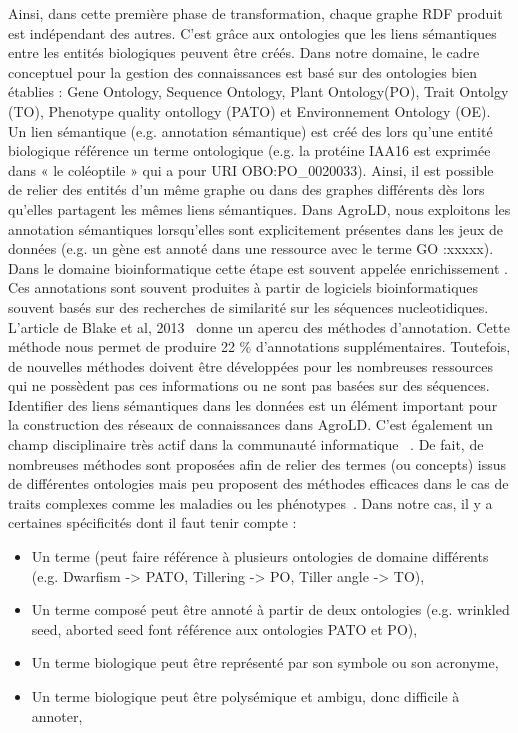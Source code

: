 Ainsi, dans cette première phase de transformation, chaque graphe RDF produit est indépendant des autres. C’est grâce aux ontologies que les liens sémantiques entre les entités biologiques peuvent être créés. Dans notre domaine, le cadre conceptuel pour la gestion des connaissances est basé sur des ontologies bien établies : Gene Ontology, Sequence Ontology, Plant Ontology(PO), Trait Ontolgy (TO), Phenotype quality ontollogy (PATO) et Environnement Ontology (OE). Un lien sémantique (e.g. annotation sémantique) est créé des lors qu’une entité biologique référence un terme ontologique (e.g. la protéine IAA16 est exprimée dans « le coléoptile » qui a pour URI OBO:PO\_0020033). Ainsi, il est possible de relier des entités d’un même graphe ou dans des graphes différents dès lors qu’elles partagent les mêmes liens sémantiques. Dans AgroLD, nous exploitons les annotation sémantiques lorsqu’elles sont explicitement présentes dans les jeux de données (e.g. un gène est annoté dans une ressource avec le terme GO :xxxxx). Dans le domaine bioinformatique cette étape est souvent appelée enrichissement \cite{Boyle2004,Sheehan2008,topgo2016}. Ces annotations sont souvent produites à partir de logiciels bioinformatiques souvent basés sur des recherches de similarité sur les séquences nucleotidiques. L'article de Blake et al, 2013~\cite{blake2013} donne un apercu des méthodes d'annotation. Cette méthode nous permet de produire 22 \% d’annotations supplémentaires. Toutefois, de nouvelles méthodes doivent être développées pour les nombreuses ressources qui ne possèdent pas ces informations ou ne sont pas basées sur des séquences.\\

Identifier des liens sémantiques dans les données est un élément important pour la construction des réseaux de connaissances dans AgroLD. C’est également un champ disciplinaire très actif dans la communauté informatique~\cite{Faria2013,Otero-Cerdeira2015} . De fait, de nombreuses méthodes sont proposées afin de relier des termes (ou concepts) issus de différentes ontologies mais peu proposent des méthodes efficaces dans le cas de traits complexes comme les maladies ou les phénotypes~\cite{harrow2017}. Dans notre cas, il y a certaines spécificités dont il faut tenir compte : \\


\begin{itemize}
\item Un terme (peut faire référence à plusieurs ontologies de domaine différents (e.g. Dwarfism -> PATO, Tillering -> PO, Tiller angle -> TO),
\item Un terme composé peut être annoté à partir de deux ontologies (e.g. wrinkled seed, aborted seed font référence aux ontologies PATO et PO),
\item Un terme biologique peut être représenté par son symbole ou son acronyme,
\item Un terme biologique peut être polysémique et ambigu, donc difficile à annoter,\\
\end{itemize}

